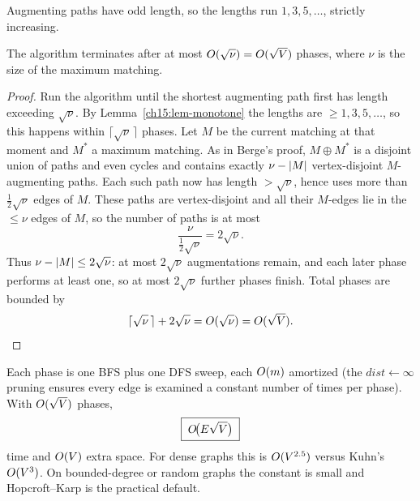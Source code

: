 Augmenting paths have odd length, so the lengths run $1,3,5,\dots$, strictly
increasing.

\begin{theorem}
\label{ch15:thm-hk-phases}
The algorithm terminates after at most $O(\sqrt{\nu})=O(\sqrt{V})$ phases,
where $\nu$ is the size of the maximum matching.
\end{theorem}

\begin{proof}
Run the algorithm until the shortest augmenting path first has length exceeding
$\sqrt{\nu}$. By Lemma~\ref{ch15:lem-monotone} the lengths are
$\ge 1,3,5,\dots$, so this happens within $\lceil\sqrt{\nu}\,\rceil$ phases. Let
$M$ be the current matching at that moment and $M^\ast$ a maximum matching. As in
Berge's proof, $M\oplus M^\ast$ is a disjoint union of paths and even cycles and
contains exactly $\nu-\lvert M\rvert$ vertex-disjoint $M$-augmenting paths. Each such
path now has length $>\sqrt{\nu}$, hence uses more than $\tfrac12\sqrt{\nu}$
edges of $M$. These paths are vertex-disjoint and all their $M$-edges lie in the
$\le\nu$ edges of $M$, so the number of paths is at most
\[
\frac{\nu}{\frac{1}{2}\sqrt{\nu}} = 2\sqrt{\nu}.
\]
Thus $\nu-\lvert M\rvert\le 2\sqrt{\nu}$: at most
$2\sqrt{\nu}$ augmentations remain, and each later phase performs at least one,
so at most $2\sqrt{\nu}$ further phases finish. Total phases are bounded by
\[
\lceil\sqrt{\nu}\,\rceil+2\sqrt{\nu}=O(\sqrt{\nu})=O(\sqrt{V}).
\]
\end{proof}

\begin{complexitybox}
Each phase is one BFS plus one DFS sweep, each $O(m)$ amortized (the
$\mathit{dist}\gets\infty$ pruning ensures every edge is examined a constant
number of times per phase). With $O(\sqrt{V})$ phases,
\[
\boxed{\;O\!\bigl(E\sqrt{V}\bigr)\;}
\]
time and $O(V)$ extra space. For dense graphs this is $O(V^{2.5})$ versus
Kuhn's $O(V^3)$. On bounded-degree or random graphs the constant is small and
Hopcroft--Karp is the practical default.
\end{complexitybox}

